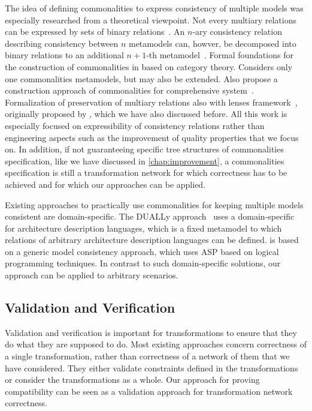 The idea of defining commonalities to express consistency of multiple models was especially researched from a theoretical viewpoint.
Not every multiary relations can be expressed by sets of binary relations~\cite{stevens2020BidirectionalTransformationLarge-SoSym}.
An $n$-ary consistency relation describing consistency between $n$ metamodels can, howver, be decomposed into binary relations to an additional $n+1$-th metamodel~\cite{stevens2020BidirectionalTransformationLarge-SoSym}.
Formal foundations for the construction of commonalities in \cite{stunkel2018MultimodelCorrespondence-ICPS} based on category theory. Considers only one commonalities metamodels, but may also be extended. 
Also propose a construction approach of commonalities for comprehensive system~\cite{stunkel2020MultipleModelSynchronization-FASE}.
Formalization of preservation of multiary relations also with lenses framework~\cite{diskin2018MultiModelSynchronization-FASE}, originally proposed by \textcite{foster2007combinators-TPLS}, which we have also discussed before.
All this work is especially focused on expressibility of consistency relations rather than engineering aspects such as the improvement of quality properties that we focus on.
In addition, if not guaranteeing specific tree structures of commonalities specification, like we have discussed in \autoref{chap:improvement}, a commonalities specification is still a transformation network for which correctness has to be achieved and for which our approaches can be applied.

Existing approaches to practically use commonalities for keeping multiple models consistent are domain-specific.
The DUALLy approach~\cite{malavolta2010ADLInteroperability-TSE, eramo2012Dually-SoSym} uses a domain-specific \conceptmetamodel for architecture description languages, which is a fixed metamodel to which relations of arbitrary architecture description languages can be defined.
\dually is based on a generic model consistency approach, which uses \gls{ASP} based on logical programming techniques.
In contrast to such domain-specific solutions, our \commonalities approach can be applied to arbitrary scenarios.


\subsection{Validation and Verification}

Validation and verification is important for transformations to ensure that they do what they are supposed to do.
Most existing approaches concern correctness of a single transformation, rather than correctness of a network of them that we have considered.
They either validate constraints defined in the transformations or consider the transformations as a whole.
Our approach for proving compatibility can be seen as a validation approach for transformation network correctness.

